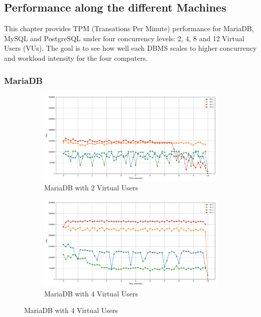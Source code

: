 \subsection{Performance along the different Machines}

This chapter provides TPM (Transations Per Minute) performance for MariaDB, MySQL and PostgreSQL under four concurrency levels: 2, 4, 8 and 12 Virtual Users (VUs). The goal is to see how well each DBMS scales to higher concurrency and workload intensity for the four computers.

\subsubsection{MariaDB}

\begin{figure}[H]
    \centering
    \hspace*{-1.7cm}
    \begin{subfigure}[b]{0.6\textwidth}
        \centering
        \includegraphics[width=\linewidth]{Images/hdbtcount_MariaDB_2.png}
        \caption{MariaDB with 2 Virtual Users}
        \label{fig:mariadb-2vu}
    \end{subfigure}%
    \begin{subfigure}[b]{0.6\textwidth}
        \centering
        \includegraphics[width=\linewidth]{Images/hdbtcount_MariaDB_4.png}
        \caption{MariaDB with 4 Virtual Users}
        \label{fig:mariadb-4vu}
    \end{subfigure}


\end{figure}
